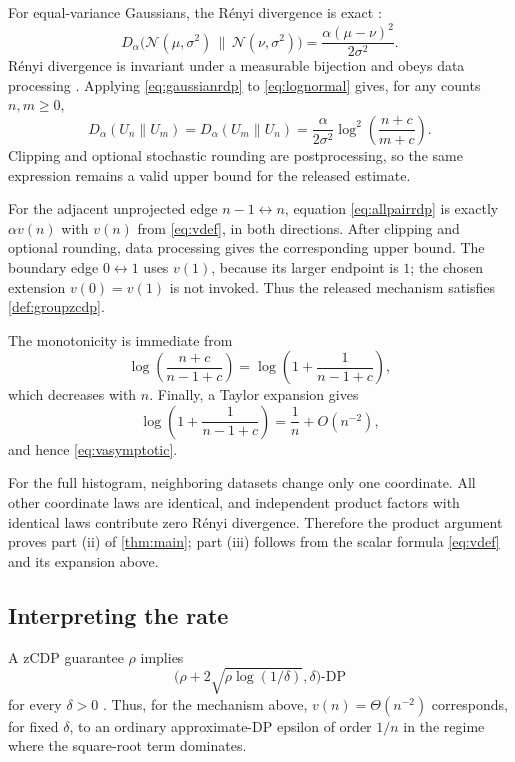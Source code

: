 \documentclass[11pt]{article}
\newcommand{\N}{\mathcal{N}}
\newcommand{\Dalpha}{D_{\alpha}}
\theoremstyle{definition}
\begin{document}
For equal-variance Gaussians, the R\'enyi divergence is exact \citep[Lemma 2.4]{BunSteinke2016}:
\begin{equation}
  \Dalpha\bigl(\N(\mu,\sigma^2)\,\|\,\N(\nu,\sigma^2)\bigr)
  =\frac{\alpha(\mu-\nu)^2}{2\sigma^2}.
  \label{eq:gaussianrdp}
\end{equation}
R\'enyi divergence is invariant under a measurable bijection and obeys data processing \citep{VanErvenHarremoes2014}. Applying \eqref{eq:gaussianrdp} to \eqref{eq:lognormal} gives, for any counts $n,m\ge 0$,
\begin{equation}
  \Dalpha(U_n\|U_m)
  =\Dalpha(U_m\|U_n)
  =\frac{\alpha}{2\sigma^2}
    \log^2\!\left(\frac{n+c}{m+c}\right).
  \label{eq:allpairrdp}
\end{equation}
Clipping and optional stochastic rounding are postprocessing, so the same expression remains a valid upper bound for the released estimate.

For the adjacent unprojected edge $n-1\leftrightarrow n$, equation \eqref{eq:allpairrdp} is exactly $\alpha v(n)$ with $v(n)$ from \eqref{eq:vdef}, in both directions. After clipping and optional rounding, data processing gives the corresponding upper bound. The boundary edge $0\leftrightarrow1$ uses $v(1)$, because its larger endpoint is $1$; the chosen extension $v(0)=v(1)$ is not invoked. Thus the released mechanism satisfies \cref{def:groupzcdp}.

The monotonicity is immediate from
\[
  \log\!\left(\frac{n+c}{n-1+c}\right)
  =\log\!\left(1+\frac{1}{n-1+c}\right),
\]
which decreases with $n$. Finally, a Taylor expansion gives
\[
  \log\!\left(1+\frac{1}{n-1+c}\right)
  =\frac{1}{n}+O(n^{-2}),
\]
and hence \eqref{eq:vasymptotic}.

For the full histogram, neighboring datasets change only one coordinate. All other coordinate laws are identical, and independent product factors with identical laws contribute zero R\'enyi divergence. Therefore the product argument proves part (ii) of \cref{thm:main}; part (iii) follows from the scalar formula \eqref{eq:vdef} and its expansion above.

\subsection{Interpreting the rate}

A zCDP guarantee $\rho$ implies
\[
  \bigl(\rho+2\sqrt{\rho\log(1/\delta)},\delta\bigr)\text{-DP}
\]
for every $\delta>0$ \citep{BunSteinke2016}. Thus, for the mechanism above, $v(n)=\Theta(n^{-2})$ corresponds, for fixed $\delta$, to an ordinary approximate-DP epsilon of order $1/n$ in the regime where the square-root term dominates.
\end{document}
